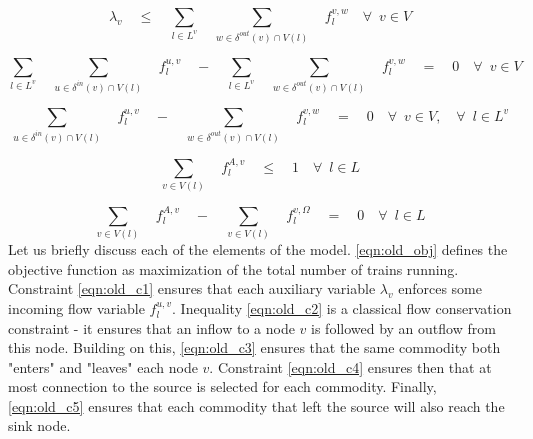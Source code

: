 \begin{equation}
  \label{eqn:old_c1}
  \lambda_{v} \quad \leq \quad \displaystyle \sum_{l \in L^v} \quad \sum_{w \in \delta^{out}(v) \cap V(l)} \quad f^{v, w}_{l} \quad \forall \enspace v \in V
\end{equation}

\begin{equation}
  \label{eqn:old_c2}
\displaystyle \sum_{l \in L^v} \quad \sum_{u \in \delta^{in}(v) \cap V(l)} \quad f^{u, v}_{l} \quad - \quad \sum_{l \in L^v} \quad \sum_{w \in \delta^{out}(v) \cap V(l)} \quad f^{v, w}_{l} \quad = \quad 0 \quad \forall \enspace v \in V
\end{equation}

\begin{equation}
  \label{eqn:old_c3}
\displaystyle \sum_{u \in \delta^{in}(v) \cap V(l)} \quad f^{u, v}_{l} \quad - \quad \sum_{w \in \delta^{out}(v) \cap V(l)} \quad f^{v, w}_{l} \quad = \quad 0 \quad \forall \enspace v \in V, \quad \forall \enspace l \in L^v
\end{equation}

\begin{equation}
  \label{eqn:old_c4}
\displaystyle \sum_{v \in V(l)} \quad f^{A, v}_{l} \quad \leq \quad 1 \quad \forall \enspace l \in L
\end{equation}

\begin{equation}
  \label{eqn:old_c5}
\displaystyle \sum_{v \in V(l)} \quad f^{A, v}_{l} \quad - \quad \sum_{v \in V(l)} \quad f^{v, \Omega}_{l} \quad = \quad 0 \quad \forall \enspace l \in L
\end{equation}
\newpage
Let us briefly discuss each of the elements of the model. \ref{eqn:old_obj} defines the objective function as maximization of the total number of trains running. Constraint \ref{eqn:old_c1} ensures that each auxiliary variable $\lambda_v$ enforces some incoming flow variable $f^{u, v}_l$. Inequality \ref{eqn:old_c2} is a classical flow conservation constraint - it ensures that an inflow to a node $v$ is followed by an outflow from this node. Building on this, \ref{eqn:old_c3} ensures that the same commodity both "enters" and "leaves" each node $v$. Constraint \ref{eqn:old_c4} ensures then that at most connection to the source is selected for each commodity. Finally, \ref{eqn:old_c5} ensures that each commodity that left the source will also reach the sink node. 
